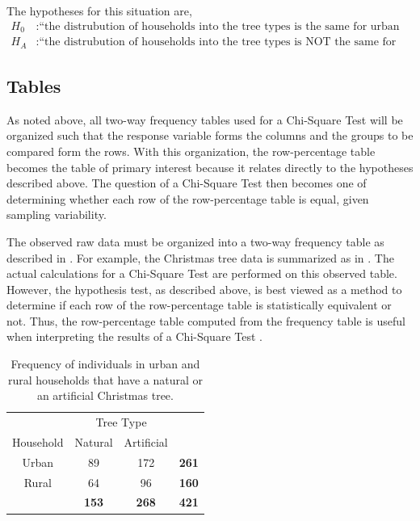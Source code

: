 \documentclass[10pt,openany]{book}\usepackage[]{graphicx}\usepackage[]{color}
\begin{document}
The hypotheses for this situation are,
\[ \begin{split}
  H_{0}&: \text{``the distrubution of households into the tree types is the same for urban and rural households''} \\
  H_{A}&: \text{``the distrubution of households into the tree types is NOT the same for urban and rural households''}
\end{split} \]


\subsection{Tables}
\vspace{-6pt}
As noted above, all two-way frequency tables used for a Chi-Square Test will be organized such that the response variable forms the columns and the groups to be compared form the rows. With this organization, the row-percentage table becomes the table of primary interest because it relates directly to the hypotheses described above. The question of a Chi-Square Test then becomes one of determining whether each row of the row-percentage table is equal, given sampling variability.

The observed raw data must be organized into a two-way frequency table as described in . For example, the Christmas tree data is summarized as in . The actual calculations for a Chi-Square Test are performed on this observed table. However, the hypothesis test, as described above, is best viewed as a method to determine if each row of the row-percentage table is statistically equivalent or not. Thus, the row-percentage table computed from the frequency table is useful when interpreting the results of a Chi-Square Test .

\begin{table}[htbp]
  \centering
  \caption{Frequency of individuals in urban and rural households that have a natural or an artificial Christmas tree.}\label{tab:ChiTreeObs}
    \begin{tabular}{c|c|c|c|}
      \multicolumn{1}{c}{} & \multicolumn{2}{c}{Tree Type} & \multicolumn{1}{c}{} \\
      \cline{2-3}
      Household & Natural & Artificial & \multicolumn{1}{c}{} \\
      \hline
      \multicolumn{1}{|c|}{Urban} & 89 & 172 & \textbf{261} \\
      \hline
      \multicolumn{1}{|c|}{Rural} & 64 & 96 & \textbf{160} \\
      \hline
       & \textbf{153} & \textbf{268} & \textbf{421} \\
      \cline{2-4}
    \end{tabular}
\end{table}
\end{document}
